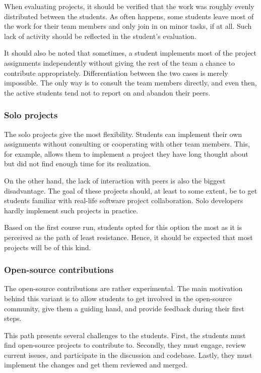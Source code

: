 \documentclass[
  digital,
  color,
  oneside,
  nosansbold,
  nocolorbold,
  nolof,
  nolot,
]{fithesis4}
\begin{document}
When evaluating projects, it should be verified that the work was roughly evenly distributed between the students. As often happens, some students leave most of the work for their team members and only join in on minor tasks, if at all. Such lack of activity should be reflected in the student's evaluation.

It should also be noted that sometimes, a student implements most of the project assignments independently without giving the rest of the team a chance to contribute appropriately. Differentiation between the two cases is merely impossible. The only way is to consult the team members directly, and even then, the active students tend not to report on and abandon their peers.

\subsubsection{Solo projects}

The solo projects give the most flexibility. Students can implement their own assignments without consulting or cooperating with other team members. This, for example, allows them to implement a project they have long thought about but did not find enough time for its realization.

On the other hand, the lack of interaction with peers is also the biggest disadvantage. The goal of these projects should, at least to some extent, be to get students familiar with real-life software project collaboration. Solo developers hardly implement such projects in practice.

Based on the first course run, students opted for this option the most as it is perceived as the path of least resistance. Hence, it should be expected that most projects will be of this kind.

\subsubsection{Open-source contributions}

The open-source contributions are rather experimental. The main motivation behind this variant is to allow students to get involved in the open-source community, give them a guiding hand, and provide feedback during their first steps. 

This path presents several challenges to the students. First, the students must find open-source projects to contribute to. Secondly, they must engage, review current issues, and participate in the discussion and codebase. Lastly, they must implement the changes and get them reviewed and merged.
\end{document}
